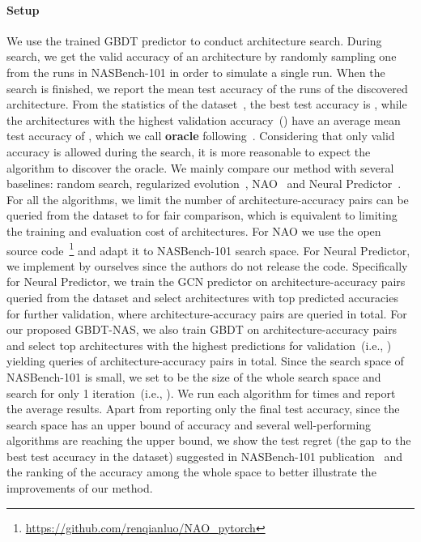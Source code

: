 \documentclass{article}
\begin{document}
\paragraph{Setup} 
We use the trained GBDT predictor to conduct architecture search. During search, we get the valid accuracy of an architecture by randomly sampling one from the  runs in NASBench-101 in order to simulate a single run. When the search is finished, we report the mean test accuracy of the  runs of the discovered architecture. From the statistics of the dataset~\cite{nasbench101,neuralpredictor}, the best test accuracy is , while the architectures with the highest validation accuracy~() have an average mean test accuracy of , which we call \textbf{oracle} following~\cite{neuralpredictor}. Considering that only valid accuracy is allowed during the search, it is more reasonable to expect the algorithm to discover the oracle.
We mainly compare our method with several baselines: random search, regularized evolution~\cite{amoebanet}, NAO~\cite{nao} and Neural Predictor~\cite{neuralpredictor}. For all the algorithms, we limit the number of architecture-accuracy pairs can be queried from the dataset to  for fair comparison,  which is equivalent to limiting the training and evaluation cost of architectures. For NAO we use the open source code~\footnote{\url{https://github.com/renqianluo/NAO_pytorch}} and adapt it to NASBench-101 search space. For Neural Predictor, we implement by ourselves since the authors do not release the code. Specifically for Neural Predictor, we train the GCN predictor on  architecture-accuracy pairs queried from the dataset and select  architectures with top predicted accuracies for further validation, where  architecture-accuracy pairs are queried in total. For our proposed GBDT-NAS, we also train GBDT on  architecture-accuracy pairs and select top  architectures with the highest predictions for validation~(i.e., ) yielding  queries of architecture-accuracy pairs in total. Since the search space of NASBench-101 is small, we set  to be the size of the whole search space and search for only 1 iteration~(i.e., ). We run each algorithm for  times and report the average results. Apart from reporting only the final test accuracy, since the search space has an upper bound of accuracy and several well-performing algorithms are reaching the upper bound, we show the test regret (the gap to the best test accuracy  in the dataset) suggested in NASBench-101 publication~\cite{nasbench101} and the ranking of the accuracy among the whole space to better illustrate the improvements of our method.
\end{document}
